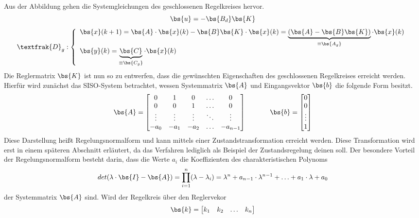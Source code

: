 Aus der Abbildung gehen die Systemgleichungen des geschlossenen Regelkreises  hervor.
\begin{equation}
\bs{u} = -\bs{B_d}\bs{K}
\end{equation}
\begin{equation}
\textfrak{D}_g
: \left\{ \begin{array}{ll}
\bs{{x}}(k+1) = \bs{A}\cdot \bs{x}(k) - \bs{B}\bs{K}\cdot \bs{x}(k) = \underbrace{(\bs{A}-\bs{B}\bs{K})}_{\equiv \bs{A_g}}\cdot \bs{x}(k) \\
\bs{y}(k) = \underbrace{\bs{C}}_{\equiv \bs{C_g}}\cdot \bs{x}(k)
\end{array}
\right.
\end{equation}
Die Reglermatrix $\bs{K}$ ist nun so zu entwerfen, dass die gewünschten Eigenschaften des geschlossenen Regelkreises erreicht werden. Hierfür wird zunächst das SISO-System  betrachtet, wessen Systemmatrix $\bs{A}$ und Eingangsvektor $\bs{b}$ die folgende Form besitzt.
\begin{equation}
\bs{A} = \begin{bmatrix}
0 & 1 & 0 & \hdots & 0 \\
0 & 0 & 1 & \hdots & 0 \\
\vdots & \vdots & \vdots & \ddots & \vdots \\
-a_0 & -a_1 & -a_2 & \hdots & -a_{n-1}
\end{bmatrix}
\hspace{35pt}
\bs{b} = \begin{bmatrix}
0 \\ 0 \\ \vdots \\ 1
\end{bmatrix}
\end{equation}
Diese Darstellung heißt Regelungsnormalform und kann mittels einer Zustandstransformation erreicht werden. Diese Transformation wird erst in einem späteren Abschnitt erläutert, da das Verfahren lediglich als Beispiel der Zustandsregelung deinen soll. 
Der besondere Vorteil der Regelungsnormalform besteht darin, dass die Werte $a_i$ die Koeffizienten des charakteristischen Polynoms 
\begin{equation}
det(\lambda\cdot \bs{I}-\bs{A}) = \prod^n_{i=1} (\lambda-\lambda_i) = \lambda^n+a_{n-1}\cdot \lambda^{n-1} + \hdots + a_1\cdot \lambda + a_0
\end{equation}
der Systemmatrix $\bs{A}$ sind. Wird der Regelkreis über den Reglervekor
\begin{equation}
\bs{k} = \begin{bmatrix}
k_1 & k_2 & \hdots & k_n
\end{bmatrix}
\end{equation}
